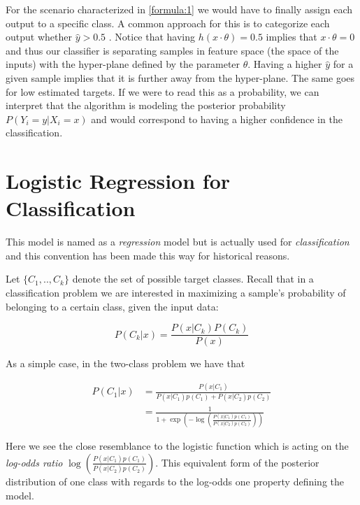 For the scenario characterized in \ref{formula:1} we would have to finally assign each output to a specific class. A common approach for this is to categorize each output whether $\hat{y} > 0.5$ \label{formula:logitThreshold}. Notice that having $h(x \cdot \theta) = 0.5$ implies that $x \cdot  \theta = 0$ and thus our classifier is separating samples in feature space (the space of the inputs) with the hyper-plane defined by the parameter $\theta$. Having a higher $\hat{y}$ for a given sample implies that it is further away from the hyper-plane. The same goes for low estimated targets. If we were to read this as a probability, we can interpret that the algorithm is modeling the posterior probability $P(Y_i = y | X_i = x)$ and would correspond to having a higher confidence in the classification.




\section{Logistic Regression for Classification}\label{section-logisticRegression}

This model is named as a \textit{regression} model but is actually used for \textit{classification} and this convention has been made this way for historical reasons.


Let $\{C_1,..,C_k\}$ denote the set of possible target classes. Recall that in a classification problem we are  interested in maximizing a sample's probability of belonging to a certain class, given the input data:

\begin{equation}
P(C_k| x) = \frac{P(x|C_k)P(C_k)}{P(x)} 
\end{equation}

As a simple case, in the two-class problem we have that


\begin{equation}
\begin{split}
P(C_1| x) & = \frac{P(x|C_1) }{P(x|C_1)p(C_1) + P(x|C_2)p(C_2)} \\
& = \frac{1 }
{1 + \exp(- \log( \frac{ P(x|C_1)p(C_1)}
{P(x|C_2)p(C_2)
}))
}
\end{split}
\end{equation}

Here we see the close resemblance to the logistic function which is acting on the \textit{log-odds ratio} $ \log( \frac{ P(x|C_1)p(C_1)}{P(x|C_2)p(C_2) })$. This equivalent form of the posterior distribution of one class with regards to the log-odds one property defining the model.


